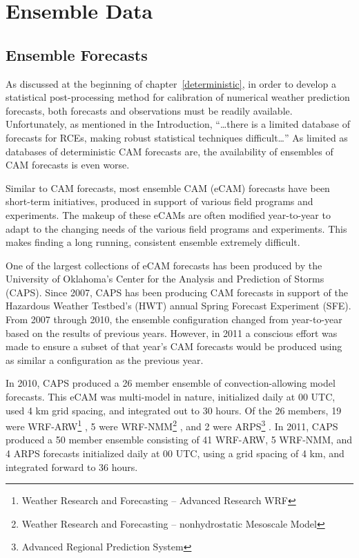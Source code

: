 

\section{Ensemble Data}
\label{edata}




\subsection{Ensemble Forecasts}
\label{emodel}

As discussed at the beginning of \mbox{chapter \ref{deterministic}}, in order to develop a statistical post-processing method for calibration of numerical weather prediction forecasts, both forecasts and observations must be readily available.
Unfortunately, as mentioned in the Introduction, ``\dots there is a limited database of forecasts for RCEs, making robust statistical techniques difficult\dots''
As limited as databases of deterministic CAM forecasts are, the availability of ensembles of CAM forecasts is even worse.


Similar to CAM forecasts, most ensemble CAM (eCAM) forecasts have been short-term initiatives, produced in support of various field programs and experiments.
The makeup of these eCAMs are often modified year-to-year to adapt to the changing needs of the various field programs and experiments.
This makes finding a long running, consistent ensemble extremely difficult.


One of the largest collections of eCAM forecasts has been produced by the University of Oklahoma's Center for the Analysis and Prediction of Storms (CAPS).
Since 2007, CAPS has been producing CAM forecasts in support of the Hazardous Weather Testbed's (HWT) annual Spring Forecast Experiment (SFE).
From 2007 through 2010, the ensemble configuration changed from year-to-year based on the results of previous years.
However, in 2011 a conscious effort was made to ensure a subset of that year's CAM forecasts would be produced using as similar a configuration as the previous year.


In 2010, CAPS produced a 26 member ensemble of convection-allowing model forecasts.
This eCAM was multi-model in nature, initialized daily at 00 UTC, used 4 km grid spacing, and integrated out to 30 hours.
Of the 26 members, 19 were WRF-ARW\footnote{Weather Research and Forecasting -- Advanced Research WRF} \citep{WRFV3}, 5 were WRF-NMM\footnote{Weather Research and Forecasting -- nonhydrostatic Mesoscale Model} \citep{NAMnWRF-NMM}, and 2 were ARPS\footnote{Advanced Regional Prediction System} \citep{ARPS}. In 2011, CAPS produced a 50 member ensemble consisting of 41 WRF-ARW, 5 WRF-NMM, and 4 ARPS forecasts initialized daily at 00 UTC, using a grid spacing of 4 km, and integrated forward to 36 hours.


